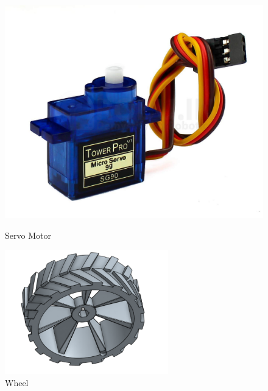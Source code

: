 \documentclass[12pt,a4paper]{report}
\begin{document}
\begin{enumerate}
\begin{figure}[H]
    \centering
    \begin{minipage}{0.30\textwidth}
        \centering
        \includegraphics[width=\textwidth]{s90}  %
        \caption{Servo Motor}
        \label{fig:s90}
    \end{minipage} \hfill
    \begin{minipage}{0.30\textwidth}
        \centering
        \includegraphics[width=\textwidth]{wheel}  %
        \caption{Wheel}
        \label{fig:wheel}
    \end{minipage} \hfill

\end{figure}
\end{enumerate}
\end{document}
